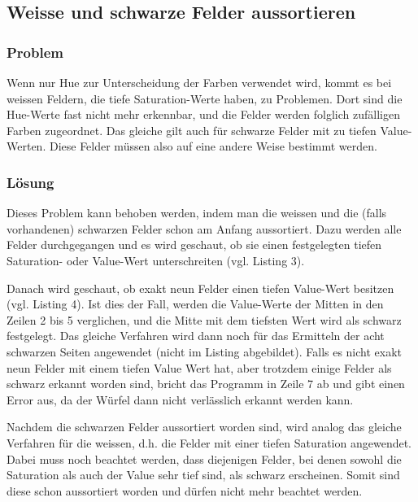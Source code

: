 \documentclass[a4paper, 12pt]{article}
\begin{document}
\subsection{Weisse und schwarze Felder aussortieren}
\subsubsection{Problem}
Wenn nur Hue zur Unterscheidung der Farben verwendet wird, kommt es bei weissen Feldern, die tiefe Saturation-Werte haben, zu Problemen. Dort sind die Hue-Werte fast nicht mehr erkennbar, und die Felder werden folglich zufälligen Farben zugeordnet. Das gleiche gilt auch für schwarze Felder mit zu tiefen Value-Werten. Diese Felder müssen also auf eine andere Weise bestimmt werden. 
\subsubsection{Lösung}
Dieses Problem kann behoben werden, indem man die weissen und die (falls vorhandenen) schwarzen Felder schon am Anfang aussortiert. Dazu werden alle Felder durchgegangen und es wird geschaut, ob sie einen festgelegten tiefen Saturation- oder Value-Wert unterschreiten (vgl. Listing 3).

Danach wird geschaut, ob exakt neun Felder einen tiefen Value-Wert besitzen (vgl. Listing 4). Ist dies der Fall, werden die Value-Werte der Mitten in den Zeilen 2 bis 5 verglichen, und die Mitte mit dem tiefsten Wert wird als schwarz festgelegt. Das gleiche Verfahren wird dann noch für das Ermitteln der acht schwarzen Seiten angewendet (nicht im Listing abgebildet). Falls es nicht exakt neun Felder mit einem tiefen Value Wert hat, aber trotzdem einige Felder als schwarz erkannt worden sind, bricht das Programm in Zeile 7 ab und gibt einen Error aus, da der Würfel dann nicht verlässlich erkannt werden kann.
\newpage 

 Nachdem die schwarzen Felder aussortiert worden sind, wird analog das gleiche Verfahren für die weissen, d.h. die Felder mit einer tiefen Saturation angewendet. Dabei muss noch beachtet werden, dass diejenigen Felder, bei denen sowohl die Saturation als auch der Value sehr tief sind, als schwarz erscheinen. Somit sind diese schon aussortiert worden und dürfen nicht mehr beachtet werden. 
\end{document}
